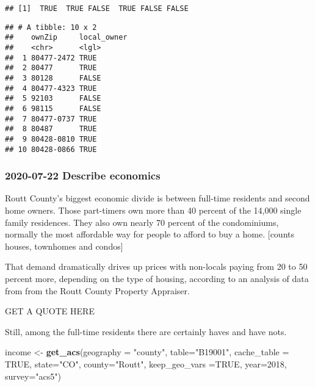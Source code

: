 \documentclass[]{article}
\newenvironment{Shaded}{\begin{snugshade}}{\end{snugshade}}
\newcommand{\DataTypeTok}[1]{\textcolor[rgb]{0.13,0.29,0.53}{#1}}
\newcommand{\DecValTok}[1]{\textcolor[rgb]{0.00,0.00,0.81}{#1}}
\newcommand{\KeywordTok}[1]{\textcolor[rgb]{0.13,0.29,0.53}{\textbf{#1}}}
\newcommand{\NormalTok}[1]{#1}
\newcommand{\OperatorTok}[1]{\textcolor[rgb]{0.81,0.36,0.00}{\textbf{#1}}}
\newcommand{\OtherTok}[1]{\textcolor[rgb]{0.56,0.35,0.01}{#1}}
\newcommand{\StringTok}[1]{\textcolor[rgb]{0.31,0.60,0.02}{#1}}
\begin{document}
\begin{verbatim}
## [1]  TRUE  TRUE FALSE  TRUE FALSE FALSE
\end{verbatim}

\begin{Shaded}
\end{Shaded}

\begin{verbatim}
## # A tibble: 10 x 2
##    ownZip     local_owner
##    <chr>      <lgl>      
##  1 80477-2472 TRUE       
##  2 80477      TRUE       
##  3 80128      FALSE      
##  4 80477-4323 TRUE       
##  5 92103      FALSE      
##  6 98115      FALSE      
##  7 80477-0737 TRUE       
##  8 80487      TRUE       
##  9 80428-0810 TRUE       
## 10 80428-0866 TRUE
\end{verbatim}

\hypertarget{describe-economics}{%
\subsubsection{2020-07-22 Describe economics}\label{describe-economics}}

Routt County's biggest economic divide is between full-time residents
and second home owners. Those part-timers own more than 40 percent of
the 14,000 single family residences. They also own nearly 70 percent of
the condominiums, normally the most affordable way for people to afford
to buy a home. {[}counts houses, townhomes and condos{]}

That demand dramatically drives up prices with non-locals paying from 20
to 50 percent more, depending on the type of housing, according to an
analysis of data from from the Routt County Property Appraiser.

GET A QUOTE HERE

Still, among the full-time residents there are certainly haves and have
nots.

\begin{Shaded}
\begin{Highlighting}[]
\NormalTok{income <-}\StringTok{ }\KeywordTok{get_acs}\NormalTok{(}\DataTypeTok{geography =} \StringTok{"county"}\NormalTok{, }\DataTypeTok{table=}\StringTok{"B19001"}\NormalTok{, }\DataTypeTok{cache_table =} \OtherTok{TRUE}\NormalTok{, }\DataTypeTok{state=}\StringTok{"CO"}\NormalTok{, }\DataTypeTok{county=}\StringTok{"Routt"}\NormalTok{, }\DataTypeTok{keep_geo_vars =}\OtherTok{TRUE}\NormalTok{, }\DataTypeTok{year=}\DecValTok{2018}\NormalTok{, }\DataTypeTok{survey=}\StringTok{"acs5"}\NormalTok{) }
\end{Highlighting}
\end{Shaded}
\end{document}
